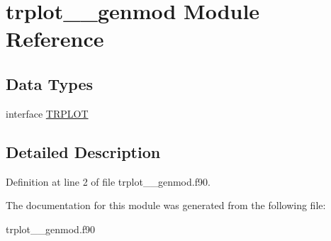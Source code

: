 \hypertarget{classtrplot____genmod}{\section{trplot\+\_\+\+\_\+genmod Module Reference}
\label{classtrplot____genmod}
}
\subsection*{Data Types}
\begin{DoxyCompactItemize}
\item 
interface \hyperlink{interfacetrplot____genmod_1_1_t_r_p_l_o_t}{T\+R\+P\+L\+O\+T}
\end{DoxyCompactItemize}


\subsection{Detailed Description}


Definition at line 2 of file trplot\+\_\+\+\_\+genmod.\+f90.



The documentation for this module was generated from the following file\+:\begin{DoxyCompactItemize}
\item 
trplot\+\_\+\+\_\+genmod.\+f90\end{DoxyCompactItemize}
